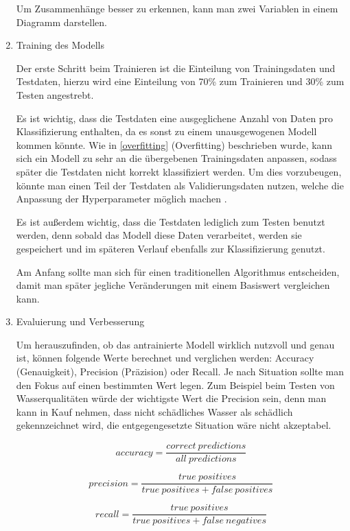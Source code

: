 \begin{enumerate}
            Um Zusammenhänge besser zu erkennen, kann man zwei Variablen in einem Diagramm darstellen.

      \item Training des Modells

            Der erste Schritt beim Trainieren ist die Einteilung von Trainingsdaten und Testdaten, hierzu wird eine Einteilung von 70\% zum Trainieren und 30\% zum Testen angestrebt.

            Es ist wichtig, dass die Testdaten eine ausgeglichene Anzahl von Daten pro Klassifizierung enthalten, da es sonst zu einem unausgewogenen Modell kommen könnte. Wie in \ref{overfitting} (Overfitting) beschrieben wurde, kann sich ein Modell zu sehr an die übergebenen Trainingsdaten anpassen, sodass später die Testdaten nicht korrekt klassifiziert werden. Um dies vorzubeugen, könnte man einen Teil der Testdaten als Validierungsdaten nutzen, welche die Anpassung der Hyperparameter möglich machen \cite{DatenZumTrainieren}.

            Es ist außerdem wichtig, dass die Testdaten lediglich zum Testen benutzt werden, denn sobald das Modell diese Daten verarbeitet, werden sie gespeichert und im späteren Verlauf ebenfalls zur Klassifizierung genutzt.

            Am Anfang sollte man sich für einen traditionellen Algorithmus entscheiden, damit man später jegliche Veränderungen mit einem Basiswert vergleichen kann.

      \item Evaluierung und Verbesserung

            Um herauszufinden, ob das antrainierte Modell wirklich nutzvoll und genau ist, können folgende Werte berechnet und verglichen werden: Accuracy (Genauigkeit), Precision (Präzision) oder Recall. Je nach Situation sollte man den Fokus auf einen bestimmten Wert legen. Zum Beispiel beim Testen von Wasserqualitäten würde der wichtigste Wert die Precision sein, denn man kann in Kauf nehmen, dass nicht schädliches Wasser als schädlich gekennzeichnet wird, die entgegengesetzte Situation wäre nicht akzeptabel. \cite{APR}

            \begin{figure}[H]
                  \[ accuracy = \frac{correct\ predictions}{all\ predictions}  \]

                  \[ precision = \frac{true\ positives}{true\ positives + false\ positives}  \]

                  \[ recall = \frac{true\ positives}{true\ positives + false\ negatives}  \]


\end{figure}
\end{enumerate}
